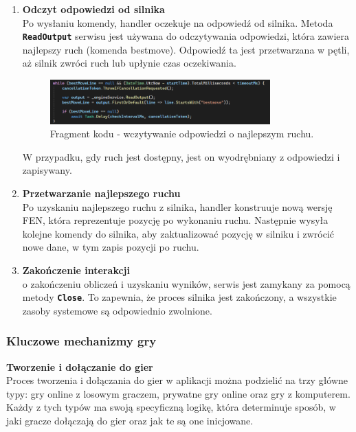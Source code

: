\documentclass[12pt,a4paper]{article}
\begin{document}
\begin{enumerate}
    \item \textbf{Odczyt odpowiedzi od silnika}\\
    Po wysłaniu komendy, handler oczekuje na odpowiedź od silnika. Metoda \texttt{\textbf{ReadOutput}} serwisu jest używana do odczytywania odpowiedzi, która zawiera najlepszy ruch (komenda bestmove). Odpowiedź ta jest przetwarzana w pętli, aż silnik zwróci ruch lub upłynie czas oczekiwania.
    
    \begin{figure}[h!]
        \centering
        \includegraphics[width=0.8\textwidth]{images/ex_read_output.png}
        \caption{Fragment kodu - wczytywanie odpowiedzi o najlepszym ruchu.}
    \end{figure}

    W przypadku, gdy ruch jest dostępny, jest on wyodrębniany z odpowiedzi i zapisywany.

    \item \textbf{Przetwarzanie najlepszego ruchu}\\
    Po uzyskaniu najlepszego ruchu z silnika, handler konstruuje nową wersję FEN, która reprezentuje pozycję po wykonaniu ruchu. Następnie wysyła kolejne komendy do silnika, aby zaktualizować pozycję w silniku i zwrócić nowe dane, w tym zapis pozycji po ruchu.

    \item \textbf{Zakończenie interakcji}\\
    o zakończeniu obliczeń i uzyskaniu wyników, serwis jest zamykany za pomocą metody \texttt{\textbf{Close}}. To zapewnia, że proces silnika jest zakończony, a wszystkie zasoby systemowe są odpowiednio zwolnione.
\end{enumerate}

\newpage

\subsubsection{Kluczowe mechanizmy gry}

\noindent \textbf{Tworzenie i dołączanie do gier}\\
Proces tworzenia i dołączania do gier w aplikacji można podzielić na trzy główne typy: gry online z losowym graczem, prywatne gry online oraz gry z komputerem. Każdy z tych typów ma swoją specyficzną logikę, która determinuje sposób, w jaki gracze dołączają do gier oraz jak te są one inicjowane.
\end{document}
